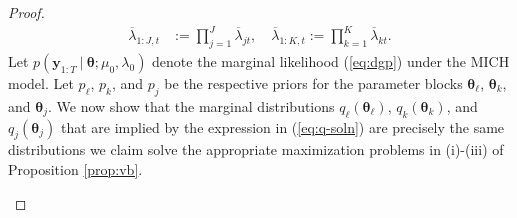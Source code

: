 \begin{proof}
\begin{align*}
    \overline{\lambda}_{1:J, t} &:= \prod_{j=1}^J \overline{\lambda}_{j t}, \quad \overline{\lambda}_{1:K, t} := \prod_{k=1}^K \overline{\lambda}_{k t}.
\end{align*}
\normalsize
Let $p\left(\mathbf{y}_{1:T} \:|\:\boldsymbol{ \theta};\mu_0,\lambda_0\right)$ denote the marginal likelihood (\ref{eq:dgp}) under the MICH model. Let $p_\ell$, $p_k$, and $p_j$ be the respective priors for the parameter blocks $\boldsymbol{\theta}_\ell$, $\boldsymbol{\theta}_k$, and $\boldsymbol{\theta}_j$. We now show that the marginal distributions $q_\ell(\boldsymbol{\theta}_\ell)$, $q_k(\boldsymbol{\theta}_k)$, and $q_j(\boldsymbol{\theta}_j)$ that are implied by the expression in (\ref{eq:q-soln}) are precisely the same distributions we claim solve the appropriate maximization problems in (i)-(iii) of Proposition \ref{prop:vb}.

\begin{enumerate}[label=\roman*.]


\end{enumerate}
\end{proof}
